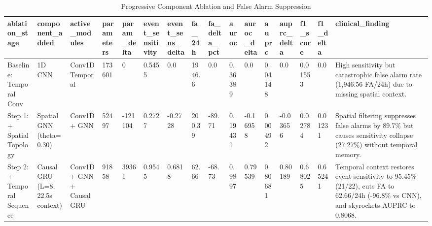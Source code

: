 \begin{table}[t]
\centering
\caption{Progressive Component Ablation and False Alarm Suppression}
\label{tab:ablation_study}
\small
\begin{tabular}{llllllllllllllll}
\toprule
ablation\_stage & component\_added & active\_modules & parameters & param\_delta & event\_sensitivity & event\_sens\_delta & fa\_24h & fa\_delta\_pct & auroc & auroc\_delta & auprc & auprc\_delta & f1\_score & f1\_delta & clinical\_finding \\
\midrule
Baseline: Temporal Conv & 1D CNN & Conv1D Temporal & 173601 & 0 & 0.5455 & 0.0 & 1946.6 & 0.0 & 0.36389 & 0.0 & 0.04148 & 0.0 & 0.01553 & 0.0 & High sensitivity but catastrophic false alarm rate (1,946.56 FA/24h) due to missing spatial context. \\
Step 1: + Spatial Topology & Spatial GNN (theta=0.30) & Conv1D + GNN & 52497 & -121104 & 0.2727 & -0.2728 & 200.39 & -89.71 & 0.19431 & -0.16958 & 0.00492 & -0.03656 & 0.02784 & 0.01231 & Spatial filtering suppresses false alarms by 89.7\% but causes sensitivity collapse (27.27\%) without temporal memory. \\
Step 2: + Temporal Sequence & Causal GRU (L=8, 22.5s context) & Conv1D + GNN + Causal GRU & 91858 & 39361 & 0.9545 & 0.6818 & 62.66 & -68.73 & 0.9897 & 0.79539 & 0.80681 & 0.80189 & 0.68025 & 0.65241 & Temporal context restores event sensitivity to 95.45\% (21/22), cuts FA to 62.66/24h (-96.8\% vs CNN), and skyrockets AUPRC to 0.8068. \\
\bottomrule
\end{tabular}
\end{table}
